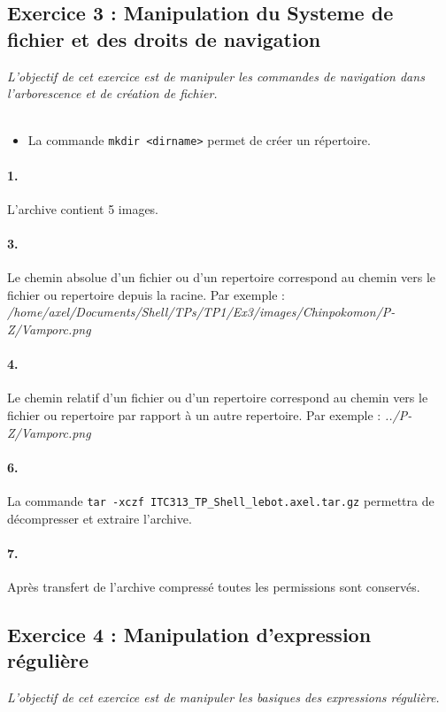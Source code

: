 \subsection{Exercice 3 : Manipulation du Systeme de fichier et des droits de navigation}
\textit{L'objectif de cet exercice est de manipuler les commandes de navigation dans l'arborescence et de création de fichier.}
\\\\
\begin{itemize}
  \item La commande \texttt{mkdir <dirname>} permet de créer un répertoire.
\end{itemize}

\paragraph{1.}
L'archive contient 5 images.

\paragraph{3.}
Le chemin absolue d'un fichier ou d'un repertoire correspond au chemin vers le fichier ou repertoire depuis la racine.
Par exemple : \textit{/home/axel/Documents/Shell/TPs/TP1/Ex3/images/Chinpokomon/P-Z/Vamporc.png}

\paragraph{4.}
Le chemin relatif d'un fichier ou d'un repertoire correspond au chemin vers le fichier ou repertoire par rapport à un autre repertoire.
Par exemple : \textit{../P-Z/Vamporc.png}

\paragraph{6.}
La commande \texttt{tar -xczf ITC313_TP_Shell_lebot.axel.tar.gz} permettra de décompresser et extraire l'archive.

\paragraph{7.}
Après transfert de l'archive compressé toutes les permissions sont conservés.

\subsection{Exercice 4 : Manipulation d'expression régulière}
\textit{L'objectif de cet exercice est de manipuler les basiques des expressions régulière.}
\\\\
